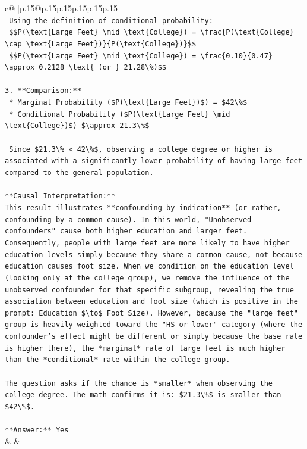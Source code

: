 \documentclass{article}
\begin{document}
{\begin{supertabular}{c@{$\;$}|p{.15\linewidth}@{}p{.15\linewidth}p{.15\linewidth}p{.15\linewidth}p{.15\linewidth}p{.15\linewidth}}
{{{\\ 
\texttt{    Using the definition of conditional probability:} \\
\texttt{    \$\$P(\textbackslash{}text\{Large Feet\} \textbackslash{}mid \textbackslash{}text\{College\}) = \textbackslash{}frac\{P(\textbackslash{}text\{College\} \textbackslash{}cap \textbackslash{}text\{Large Feet\})\}\{P(\textbackslash{}text\{College\})\}\$\$} \\
\texttt{    \$\$P(\textbackslash{}text\{Large Feet\} \textbackslash{}mid \textbackslash{}text\{College\}) = \textbackslash{}frac\{0.10\}\{0.47\} \textbackslash{}approx 0.2128 \textbackslash{}text\{ (or \} 21.28\textbackslash{}\%)\$\$} \\
\\ 
\texttt{3.  **Comparison:**} \\
\texttt{    *   Marginal Probability (\$P(\textbackslash{}text\{Large Feet\})\$) = \$42\textbackslash{}\%\$} \\
\texttt{    *   Conditional Probability (\$P(\textbackslash{}text\{Large Feet\} \textbackslash{}mid \textbackslash{}text\{College\})\$) \$\textbackslash{}approx 21.3\textbackslash{}\%\$} \\
\\ 
\texttt{    Since \$21.3\textbackslash{}\% < 42\textbackslash{}\%\$, observing a college degree or higher is associated with a significantly lower probability of having large feet compared to the general population.} \\
\\ 
\texttt{**Causal Interpretation:**} \\
\texttt{This result illustrates **confounding by indication** (or rather, confounding by a common cause). In this world, "Unobserved confounders" cause both higher education and larger feet. Consequently, people with large feet are more likely to have higher education levels simply because they share a common cause, not because education causes foot size. When we condition on the education level (looking only at the college group), we remove the influence of the unobserved confounder for that specific subgroup, revealing the true association between education and foot size (which is positive in the prompt: Education \$\textbackslash{}to\$ Foot Size). However, because the "large feet" group is heavily weighted toward the "HS or lower" category (where the confounder's effect might be different or simply because the base rate is higher there), the *marginal* rate of large feet is much higher than the *conditional* rate within the college group.} \\
\\ 
\texttt{The question asks if the chance is *smaller* when observing the college degree. The math confirms it is: \$21.3\textbackslash{}\%\$ is smaller than \$42\textbackslash{}\%\$.} \\
\\ 
\texttt{**Answer:** Yes} \\
            }
        }
    }
    & & \\ \\


\end{supertabular}}
\end{document}
